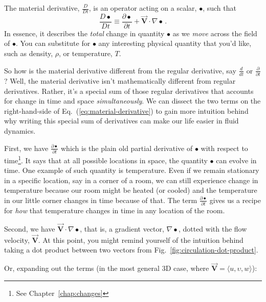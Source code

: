 The material derivative, $\frac{D}{Dt}$, is an operator acting on a scalar, $\bullet$, such that
\begin{equation} \label{eq:material-derivative}
\frac{D \bullet}{D t} \equiv \frac{\partial \bullet}{\partial t} + \vec{\bm{V}} \cdot \nabla \bullet \, .
\end{equation}
In essence, it describes the \textit{total} change in quantity $\bullet$ as we \textit{move} across the field of $\bullet$. You can substitute for $\bullet$ any interesting physical quantity that you'd like, such as density, $\rho$, or temperature, $T$.

So how is the material derivative different from the regular derivative, say $\frac{d}{dt}$ or $\frac{\partial}{\partial t}$? Well, the material derivative isn't mathematically different from regular derivatives. Rather, it's a special sum of those regular derivatives that accounts for change in time and space \textit{simultaneously}. We can dissect the two terms on the right-hand-side of Eq.~(\ref{eq:material-derivative}) to gain more intuition behind why writing this special sum of derivatives can make our life easier in fluid dynamics.

First, we have $\frac{\partial \bullet}{\partial t}$ which is the plain old partial derivative of $\bullet$ with respect to time\footnote{See Chapter~\ref{chap:changes}}. It says that at all possible locations in space, the quantity $\bullet$ can evolve in time. One example of such quantity is temperature. Even if we remain stationary in a specific location, say in a corner of a room, we can still experience change in temperature because our room might be heated (or cooled) and the temperature in our little corner changes in time because of that. The term $\frac{\partial \bullet}{\partial t}$ gives us a recipe for \textit{how} that temperature changes in time in any location of the room.

Second, we have $\vec{\bm{V}} \cdot \nabla \bullet$, that is, a gradient vector, $\nabla \bullet$, dotted with the flow velocity, $\vec{\bm{V}}$. At this point, you might remind yourself of the intuition behind taking a dot product between two vectors from Fig.~\ref{fig:circulation-dot-product}. 



Or, expanding out the terms (in the most general 3D case, where $\vec{\bm{V}} = \langle u, \upsilon, w \rangle$):

